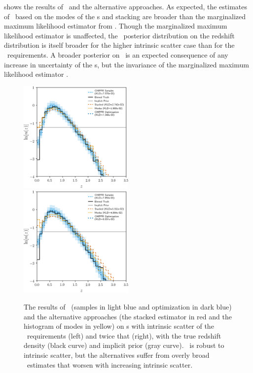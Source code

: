  shows the results of \Chippr\ and the alternative approaches.
As expected, the estimates of \nz\ based on the modes of the \pzpdf s and stacking are broader than the marginalized maximum likelihood estimator from \chippr.
Though the marginalized maximum likelihood estimator is unaffected, the \Chippr\ posterior distribution on the redshift distribution is itself broader for the higher intrinsic scatter case than for the \lsst\ requirements.
A broader posterior on \nz\ is an expected consequence of any increase in uncertainty of the \pzpdf s, but the invariance of the marginalized maximum likelihood estimator .

\begin{figure}
	\includegraphics[width=0.5\textwidth]{figures/chippr/results_scatter1.png}
	\includegraphics[width=0.5\textwidth]{figures/chippr/results_scatter2.png}
	\caption{
		The results of \Chippr\ (samples in light blue and optimization in dark blue) and the alternative approaches (the stacked estimator in red and the histogram of modes in yellow) on \pzpdf s with intrinsic scatter of the \lsst\ requirements (left) and twice that (right), with the true redshift density (black curve) and implicit prior (gray curve).
		\Chippr\ is robust to intrinsic scatter, but the alternatives suffer from overly broad \nz\ estimates that worsen with increasing intrinsic scatter.
	}
\end{figure}

